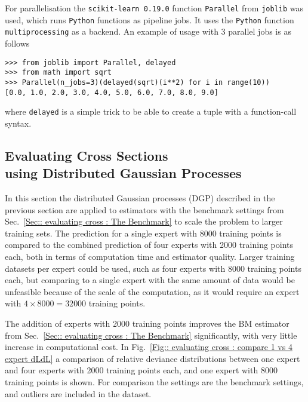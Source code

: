 \documentclass[twoside,english]{uiofysmaster}
\begin{document}
{{%

For parallelisation the \verb|scikit-learn 0.19.0| function \verb|Parallel| from \verb|joblib| was used, which runs \verb|Python| functions as pipeline jobs. It uses the \verb|Python| function \verb|multiprocessing| as a backend. An example of usage with 3 parallel jobs is as follows
\begin{lstlisting}
>>> from joblib import Parallel, delayed
>>> from math import sqrt
>>> Parallel(n_jobs=3)(delayed(sqrt)(i**2) for i in range(10))
[0.0, 1.0, 2.0, 3.0, 4.0, 5.0, 6.0, 7.0, 8.0, 9.0]
\end{lstlisting}
where \verb|delayed| is a simple trick to be able to create a tuple with a function-call syntax.





\subsection{Evaluating Cross Sections\\ using Distributed Gaussian Processes}

In this section the distributed Gaussian processes (DGP) described in the previous section are applied to estimators with the benchmark settings from Sec.~\ref{Sec:: evaluating cross : The Benchmark} to scale the problem to larger training sets. The prediction for a single expert with 8000 training points is compared to the combined prediction of four experts with 2000 training points each, both in terms of computation time and estimator quality. Larger training datasets per expert could be used, such as four experts with 8000 training points each, but comparing to a single expert with the same amount of data would be unfeasible because of the scale of the computation, as it would require an expert with $4 \times 8000 = 32 000$ training points.


The addition of experts with 2000 training points improves the BM estimator from Sec.~\ref{Sec:: evaluating cross : The Benchmark} significantly, with very little increase in computational cost. In Fig.~\ref{Fig:: evaluating cross : compare 1 vs 4 expert dLdL} a comparison of relative deviance distributions between one expert and four experts with 2000 training points each, and one expert with 8000 training points is shown.  For comparison the settings are the benchmark settings, and outliers are included in the dataset. 

}}
\end{document}
